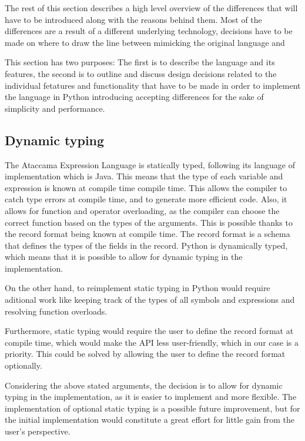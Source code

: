 The rest of this section describes a high level overview of the differences that
will have to be introduced along with the reasons behind them. Most of the
differences are a result of a different underlying technology, decisions have to be
made on where to draw the line between mimicking the original language and

This section has two purposes: The first is to describe the language and its features, the second is to outline and discuss design decisions related to the individual fetatures and functionality that have to be made in order to implement the language in Python 
introducing accepting differences for the sake of simplicity and performance.

\subsection{Dynamic typing}

The Ataccama Expression Language is statically typed, following its language
of implementation which is Java. This means that the type of each variable and
expression is known at compile time compile time. This allows the compiler to
catch type errors at compile time, and to generate more efficient code. Also,
it allows for function and operator overloading, as the compiler can choose the
correct function based on the types of the arguments.
This is possible thanks to the record format being known at compile time. The
record format is a schema that defines the types of the fields in the record.
Python is dynamically typed, which means that it is possible to allow for
dynamic typing in the implementation.

On the other hand, to reimplement static typing in Python would require
aditional work like keeping track of the types of all symbols and expressions and
resolving function overloads.

Furthermore, static typing would require the user to define the record format
at compile time, which would make the API less user-friendly, which in our case
is a priority. This could be solved by allowing the user to define the record format optionally.

Considering the above stated arguments, the decision is to allow for dynamic
typing in the implementation, as it is easier to implement and more flexible. 
The implementation of optional static typing is a possible future improvement, but for the initial implementation would
constitute a great effort for little gain from the user's perspective.

